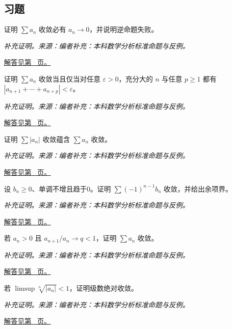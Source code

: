 \documentclass[UTF8,12pt,a4paper,fontset=fandol]{ctexart}
\begin{document}
\subsection{习题}
\begin{example}[级数收敛的必要条件]\label{ex:c29q1}
证明 $\sum a_n$ 收敛必有 $a_n\to0$，并说明逆命题失败。
\par\textit{补充证明。来源：编者补充：本科数学分析标准命题与反例。}\par\hyperref[ans:c29q1]{解答见第~\pageref{ans:c29q1} 页。}
\end{example}
\begin{example}\label{ex:c29q2}
证明 $\sum a_n$ 收敛当且仅当对任意 $\varepsilon>0$，充分大的 $n$ 与任意 $p\ge1$ 都有 $|a_{n+1}+\cdots+a_{n+p}|<\varepsilon$。
\par\textit{补充证明。来源：编者补充：本科数学分析标准命题与反例。}\par\hyperref[ans:c29q2]{解答见第~\pageref{ans:c29q2} 页。}
\end{example}
\begin{example}[绝对收敛定理]\label{ex:c29q3}
证明 $\sum|a_n|$ 收敛蕴含 $\sum a_n$ 收敛。
\par\textit{补充证明。来源：编者补充：本科数学分析标准命题与反例。}\par\hyperref[ans:c29q3]{解答见第~\pageref{ans:c29q3} 页。}
\end{example}
\begin{example}\label{ex:c29q4}
设 $b_n\ge0$、单调不增且趋于0。证明 $\sum(-1)^{n-1}b_n$ 收敛，并给出余项界。
\par\textit{补充证明。来源：编者补充：本科数学分析标准命题与反例。}\par\hyperref[ans:c29q4]{解答见第~\pageref{ans:c29q4} 页。}
\end{example}
\begin{example}[比值判别为何有效]\label{ex:c29q5}
若 $a_n>0$ 且 $a_{n+1}/a_n\to q<1$，证明 $\sum a_n$ 收敛。
\par\textit{补充证明。来源：编者补充：本科数学分析标准命题与反例。}\par\hyperref[ans:c29q5]{解答见第~\pageref{ans:c29q5} 页。}
\end{example}
\begin{example}[根值判别与统一指数界]\label{ex:c29q6}
若 $\limsup\sqrt[n]{|a_n|}<1$，证明级数绝对收敛。
\par\textit{补充证明。来源：编者补充：本科数学分析标准命题与反例。}\par\hyperref[ans:c29q6]{解答见第~\pageref{ans:c29q6} 页。}
\end{example}
\end{document}
